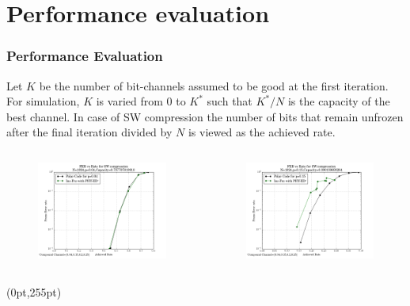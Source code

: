 \documentclass[xcolor=dvipsnames]{beamer}
\newcommand\hypercorner[1]{%
  \begin{textblock*}{\paperwidth}(0pt,255pt)
    \raggedleft #1\hspace{.5em}
  \end{textblock*}}
\begin{document}
\section{Performance evaluation}
\begin{frame}[label=psw1]
\frametitle{Performance Evaluation}
Let $K$ be the number of bit-channels assumed to be good at the first iteration. For simulation, $K$ is varied from $0$ to $K^*$ such that $K^*/N$ is the capacity of the best channel. In case of SW compression the number of bits that remain unfrozen after the final iteration divided by $N$ is viewed as the achieved rate.
\begin{minipage}[1.1\textheight]{\textwidth}
\begin{columns}
\begin{column}{0.5\textwidth}
\begin{figure}
\centering
\includegraphics[width=6cm]{./FERSW_0p04.png}
\end{figure}
\end{column}
\begin{column}{0.5\textwidth}
\begin{figure}
\centering
\includegraphics[width=6cm]{./FERSW_0p15.png}
\end{figure}
\end{column}
\end{columns}
\end{minipage}
\hypercorner{\hyperlink{pch1}{}}
\end{frame}
\end{document}
